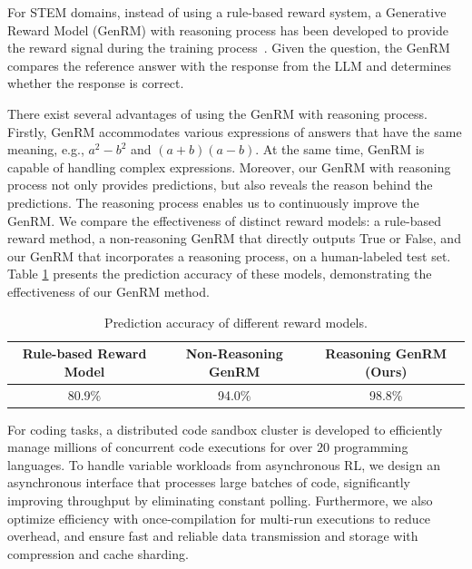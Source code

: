 For STEM domains, instead of using a rule-based reward system, a Generative Reward Model (GenRM) with reasoning process has been developed to provide the reward signal during the training process~\citep{zhou2025libra}. Given the question, the GenRM compares the reference answer with the response from the LLM and determines whether the response is correct.


There exist several advantages of using the GenRM with reasoning process. Firstly, GenRM accommodates various expressions of answers that have the same meaning, e.g., $a^2 - b^2$ and $(a+b)(a-b)$. At the same time, GenRM is capable of handling complex expressions. Moreover, our GenRM with reasoning process not only provides predictions, but also reveals the reason behind the predictions. The reasoning process enables us to continuously improve the GenRM. We compare the effectiveness of distinct reward models: a rule-based reward method, a non-reasoning GenRM that directly outputs True or False, and our GenRM that incorporates a reasoning process, on a human-labeled test set. Table \ref{tab:reward_models_accuracy} presents the prediction accuracy of these models, demonstrating the effectiveness of our GenRM method.
\begin{table}[h]
\small
\centering
\caption{Prediction accuracy of different reward models.}
  \begin{tabular}{ccc}
    \toprule
    Rule-based Reward Model & Non-Reasoning GenRM & Reasoning GenRM (Ours) \\
    \midrule
    80.9\%            & 94.0\%              & 98.8\% \\
    \bottomrule
\end{tabular}
\label{tab:reward_models_accuracy}
\end{table}

For coding tasks, a distributed code sandbox cluster is developed to efficiently manage millions of concurrent code executions for over $20$ programming languages. 
To handle variable workloads from asynchronous RL, we design an asynchronous interface that processes large batches of code, significantly improving throughput by eliminating constant polling. Furthermore, we also optimize efficiency with once-compilation for multi-run executions to reduce overhead, and ensure fast and reliable data transmission and storage with compression and cache sharding.

